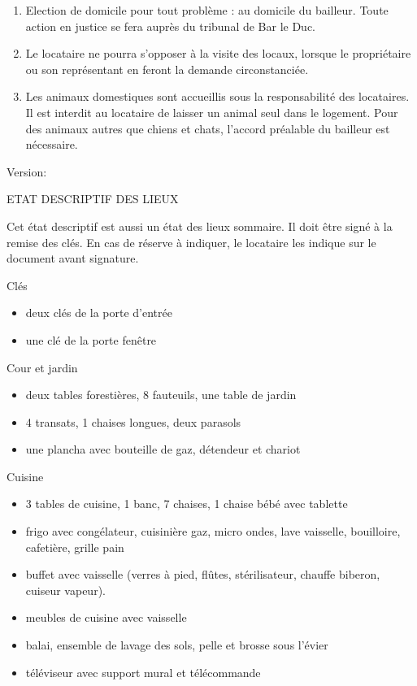 \documentclass[a4paper,11pt]{article}
\begin{document}
\begin{enumerate}
\item Election de domicile pour tout problème : au domicile du bailleur. Toute action en justice se fera auprès du tribunal de Bar le Duc.

\item Le locataire ne pourra s’opposer à la visite des locaux, lorsque le propriétaire ou son représentant en feront la demande circonstanciée.

\item Les animaux domestiques sont accueillis sous la responsabilité des locataires. Il est interdit au locataire de laisser un animal seul dans le logement. Pour des animaux autres que chiens et chats, l'accord préalable du bailleur est nécessaire.

\end{enumerate}

\hspace{10cm}
Version: \date{\today}


\normalsize

\newpage{}

ETAT DESCRIPTIF DES LIEUX
 
Cet état descriptif est aussi un état des lieux sommaire. Il doit être signé à la remise des clés. En cas de réserve à indiquer, le locataire les indique sur le document avant signature.

\vspace{0.25cm}


Clés
\begin{itemize}
\item deux clés de la porte d'entrée
\item une clé de la porte fenêtre
\end{itemize}


\vspace{0.25cm}

Cour et jardin
\begin{itemize}
\item deux tables forestières, 8 fauteuils, une table de jardin
\item 4 transats, 1 chaises longues, deux parasols
\item une plancha avec bouteille de gaz, détendeur et chariot
\end{itemize}

\vspace{0.25cm}

Cuisine
\begin{itemize}
\item 3 tables de cuisine, 1 banc, 7 chaises, 1 chaise bébé avec tablette
\item frigo avec congélateur, cuisinière gaz, micro ondes, lave vaisselle, bouilloire, cafetière, grille pain
\item buffet avec vaisselle (verres à pied, flûtes, stérilisateur, chauffe biberon, cuiseur vapeur).
\item meubles de cuisine avec vaisselle
\item balai, ensemble de lavage des sols, pelle et brosse sous l'évier
\item téléviseur avec support mural et télécommande
\end{itemize}
\end{document}
